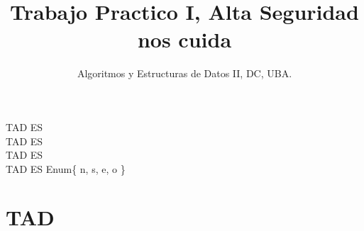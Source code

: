 \documentclass[8pt, a4paper]{article}
\author{Algoritmos y Estructuras de Datos II, DC, UBA.}
\date{}
\title{Trabajo Practico I, Alta Seguridad nos cuida}
\begin{document}
\thispagestyle{empty}

\maketitle
\tableofcontents

\newpage


TAD  ES  \\
TAD  ES  \\
TAD  ES  \\
TAD  ES Enum\{ n, s, e, o \}


\section{TAD }
\end{document}
